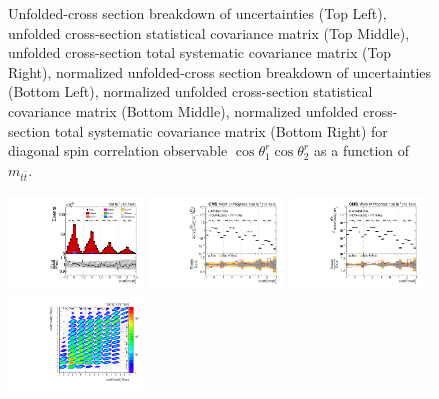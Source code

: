 \begin{refsection}
\begin{figure}[htb]
\begin{center}
\caption{Unfolded-cross section breakdown of uncertainties (Top Left), unfolded cross-section statistical covariance matrix (Top Middle), unfolded cross-section total systematic covariance matrix (Top Right), normalized unfolded-cross section breakdown of uncertainties (Bottom Left), normalized unfolded cross-section statistical covariance matrix (Bottom Middle), normalized unfolded cross-section total systematic covariance matrix (Bottom Right) for diagonal spin correlation observable $\cos\theta_{1}^{r}\cos\theta_{2}^{r}$ as a function of $m_{t\bar{t}}$.}
\label{fig:c_rr_mttbar_uncertainties}
\end{center}
\end{figure}
\clearpage
\begin{figure}[htb]
\begin{center}
 \includegraphics[width=0.32\textwidth]{fig_fullRun2UL/controlplots/combined/Hyp_LLBarCnn_vs_TTBarMass.pdf}
 \includegraphics[width=0.32\textwidth]{fig_fullRun2UL/unfolding/combined/UnfoldedResults_c_nn_mttbar.pdf}
 \includegraphics[width=0.32\textwidth]{fig_fullRun2UL/unfolding/combined/UnfoldedResultsNorm_c_nn_mttbar.pdf} \\
 \includegraphics[width=0.32\textwidth]{fig_fullRun2UL/unfolding/combined/ResponseMatrix_c_nn_mttbar.pdf}

\end{center}
\end{figure}
\end{refsection}
